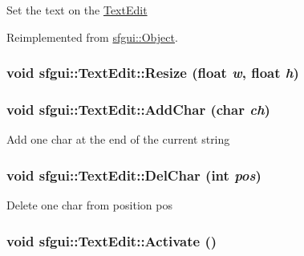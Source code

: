 Set the text on the \hyperlink{classsfgui_1_1TextEdit}{TextEdit} 

Reimplemented from \hyperlink{classsfgui_1_1Object_64c05d85588778a652d11c7a1daf8db0}{sfgui::Object}.\hypertarget{classsfgui_1_1TextEdit_58afd20cc7cec80bf02603cc5e47143a}{
\subsubsection[Resize]{\setlength{\rightskip}{0pt plus 5cm}void sfgui::TextEdit::Resize (float {\em w}, \/  float {\em h})}}
\label{classsfgui_1_1TextEdit_58afd20cc7cec80bf02603cc5e47143a}


\hypertarget{classsfgui_1_1TextEdit_203952f38ce3bd68695597fee4b4397b}{
\subsubsection[AddChar]{\setlength{\rightskip}{0pt plus 5cm}void sfgui::TextEdit::AddChar (char {\em ch})}}
\label{classsfgui_1_1TextEdit_203952f38ce3bd68695597fee4b4397b}




Add one char at the end of the current string \hypertarget{classsfgui_1_1TextEdit_dc95dab7bac1c41d0cebff1268f80c22}{
\subsubsection[DelChar]{\setlength{\rightskip}{0pt plus 5cm}void sfgui::TextEdit::DelChar (int {\em pos})}}
\label{classsfgui_1_1TextEdit_dc95dab7bac1c41d0cebff1268f80c22}




Delete one char from position pos \hypertarget{classsfgui_1_1TextEdit_bcd256e053ae8f13a5c7f919f79c03c9}{
\subsubsection[Activate]{\setlength{\rightskip}{0pt plus 5cm}void sfgui::TextEdit::Activate ()}}
\label{classsfgui_1_1TextEdit_bcd256e053ae8f13a5c7f919f79c03c9}




